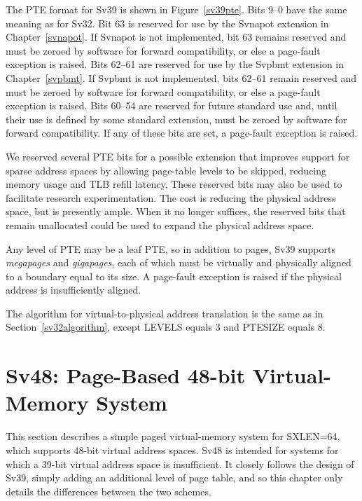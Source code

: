 The PTE format for Sv39 is shown in Figure~\ref{sv39pte}.  Bits 9--0
have the same meaning as for Sv32.
Bit 63 is reserved for use by the Svnapot extension in
Chapter~\ref{svnapot}.  If Svnapot is not implemented, bit 63 remains
reserved and must be zeroed by software for forward compatibility,
or else a page-fault exception is raised.
Bits 62--61 are reserved for use by the Svpbmt extension in
Chapter~\ref{svpbmt}.  If Svpbmt is not implemented, bits 62--61 remain
reserved and must be zeroed by software for forward compatibility,
or else a page-fault exception is raised.
Bits 60--54 are reserved
for future standard use and, until their use is defined by some standard
extension, must be zeroed by software for forward compatibility.
If any of these bits are set, a page-fault exception is raised.

\begin{commentary}
We reserved several PTE bits for a possible extension that improves
support for sparse address spaces by allowing page-table levels to be
skipped, reducing memory usage and TLB refill latency.  These reserved
bits may also be used to facilitate research experimentation.  The
cost is reducing the physical address space, but  is
presently ample.  When it no longer suffices, the reserved
bits that remain unallocated could be used to expand the physical
address space.
\end{commentary}

Any level of PTE may be a leaf PTE, so in addition to 
pages, Sv39 supports  {\em megapages} and
 {\em gigapages}, each of which must be virtually and
physically aligned to a boundary equal to its size.
A page-fault exception is raised if the physical address is insufficiently
aligned.

The algorithm for virtual-to-physical address translation is the same as in
Section~\ref{sv32algorithm}, except LEVELS equals 3 and PTESIZE equals 8.

\section{Sv48: Page-Based 48-bit Virtual-Memory System}
\label{sec:sv48}

This section describes a simple paged virtual-memory system
for SXLEN=64, which supports 48-bit virtual address spaces.  Sv48
is intended for systems for which a 39-bit virtual address space is
insufficient.  It closely follows the design of Sv39, simply adding an
additional level of page table, and so this chapter only details the
differences between the two schemes.

